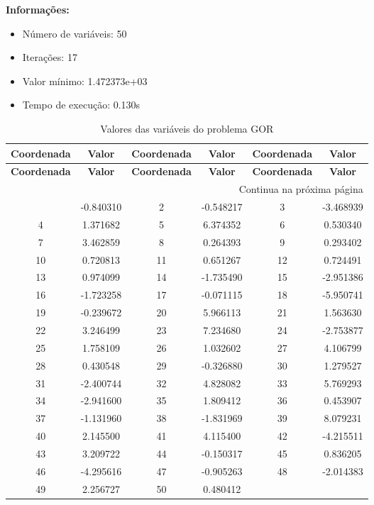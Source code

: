 \documentclass[12pt]{article}
\begin{document}
\textbf{Informações:}
\begin{itemize}
\item Número de variáveis: 50
\item Iterações: 17
\item Valor mínimo: 1.472373e+03
\item Tempo de execução: 0.130s
\end{itemize}

\small
\begin{longtable}{@{}cc|cc|cc@{}}
\caption{Valores das variáveis do problema GOR} \\
\toprule
\textbf{Coordenada} & \textbf{Valor} & \textbf{Coordenada} & \textbf{Valor} & \textbf{Coordenada} & \textbf{Valor} \\
\midrule
\endfirsthead

\toprule
\textbf{Coordenada} & \textbf{Valor} & \textbf{Coordenada} & \textbf{Valor} & \textbf{Coordenada} & \textbf{Valor} \\
\midrule
\endhead

\midrule \multicolumn{6}{r}{{Continua na próxima página}} \\ \midrule
\endfoot

\bottomrule
\endlastfoot
1 & -0.840310 & 2 & -0.548217 & 3 & -3.468939 \\
4 & 1.371682 & 5 & 6.374352 & 6 & 0.530340 \\
7 & 3.462859 & 8 & 0.264393 & 9 & 0.293402 \\
10 & 0.720813 & 11 & 0.651267 & 12 & 0.724491 \\
13 & 0.974099 & 14 & -1.735490 & 15 & -2.951386 \\
16 & -1.723258 & 17 & -0.071115 & 18 & -5.950741 \\
19 & -0.239672 & 20 & 5.966113 & 21 & 1.563630 \\
22 & 3.246499 & 23 & 7.234680 & 24 & -2.753877 \\
25 & 1.758109 & 26 & 1.032602 & 27 & 4.106799 \\
28 & 0.430548 & 29 & -0.326880 & 30 & 1.279527 \\
31 & -2.400744 & 32 & 4.828082 & 33 & 5.769293 \\
34 & -2.941600 & 35 & 1.809412 & 36 & 0.453907 \\
37 & -1.131960 & 38 & -1.831969 & 39 & 8.079231 \\
40 & 2.145500 & 41 & 4.115400 & 42 & -4.215511 \\
43 & 3.209722 & 44 & -0.150317 & 45 & 0.836205 \\
46 & -4.295616 & 47 & -0.905263 & 48 & -2.014383 \\
49 & 2.256727 & 50 & 0.480412 &  &  \\

\end{longtable}
\end{document}
